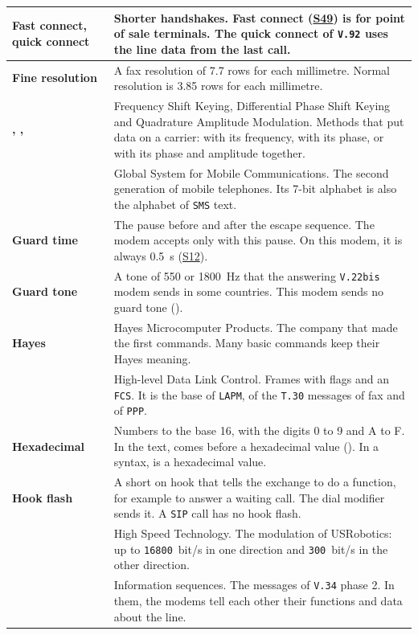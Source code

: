 \documentclass[a5paper,10pt]{article}
\makeatletter
\newcommand{\cmd}[1]{\texttt{#1}}
\newcommand{\std}[1]{\texttt{#1}}
\newcommand{\stdb}[1]{\textpdfrender{TextRenderingMode=FillStroke,
  LineWidth=0.25pt}{\texttt{#1}}}
\newcommand{\p}[1]{\textmd{\textit{#1}}}
\newcommand{\cmdl}[2][]{\hyperlink{cmd:#1}{\cmd{#2}}}
\newcommand{\sreg}[1]{\hyperlink{sreg:#1}{S#1}}
\let\cmd\@firstofone
\let\p\@firstofone
\makeatother
\begin{document}
{\begin{longtable}{|>{\raggedright\arraybackslash}p{}|>{\raggedright\arraybackslash}p{}|}
\textbf{Fast connect, quick connect} & Shorter handshakes.  Fast connect (\sreg{49}) is for point of sale terminals.  The quick connect of \std{V.92} uses the line data from the last call. \\ \hline
\textbf{Fine resolution} & A fax resolution of 7.7 rows for each millimetre.  Normal resolution is 3.85 rows for each millimetre. \\ \hline
\textbf{\stdb{FSK}, \stdb{DPSK}, \stdb{QAM}} & Frequency Shift Keying, Differential Phase Shift Keying and Quadrature Amplitude Modulation.  Methods that put data on a carrier: with its frequency, with its phase, or with its phase and amplitude together. \\ \hline
\textbf{\stdb{GSM}} & Global System for Mobile Communications.  The second generation of mobile telephones.  Its 7-bit alphabet is also the alphabet of \std{SMS} text. \\ \hline
\textbf{Guard time} & The pause before and after the escape sequence.  The modem accepts \cmd{+++} only with this pause.  On this modem, it is always 0.5~s (\sreg{12}). \\ \hline
\textbf{Guard tone} & A tone of 550 or 1800~Hz that the answering \std{V.22bis} modem sends in some countries.  This modem sends no guard tone (\cmdl[ampG]{\&G}). \\ \hline
\textbf{Hayes} & Hayes Microcomputer Products.  The company that made the first \cmd{AT} commands.  Many basic commands keep their Hayes meaning. \\ \hline
\textbf{\stdb{HDLC}} & High-level Data Link Control.  Frames with flags and an \std{FCS}.  It is the base of \std{LAPM}, of the \std{T.30} messages of fax and of \std{PPP}. \\ \hline
\textbf{Hexadecimal} & Numbers to the base 16, with the digits 0 to 9 and A to F.  In the text, \cmd{0x} comes before a hexadecimal value (\cmd{0x10}).  In a syntax, \p{h} is a hexadecimal value. \\ \hline
\textbf{Hook flash} & A short on hook that tells the exchange to do a function, for example to answer a waiting call.  The dial modifier \cmd{!} sends it.  A \std{SIP} call has no hook flash. \\ \hline
\textbf{\stdb{HST}} & High Speed Technology.  The modulation of USRobotics: up to \std{16800}~bit/s in one direction and \std{300}~bit/s in the other direction. \\ \hline
\textbf{\stdb{INFO}} & Information sequences.  The messages of \std{V.34} phase 2.  In them, the modems tell each other their functions and data about the line. \\ \hline

\end{longtable}}
\end{document}
